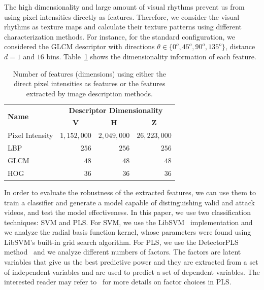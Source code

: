 \documentclass[journal]{IEEEtran}
\newcommand {\otoprule}{\midrule[\heavyrulewidth]}
\begin{document}
The high dimensionality and large amount of visual rhythms prevent us from using pixel intensities {directly} as features. Therefore, we consider the visual rhythms as texture maps and calculate their texture patterns using different characterization methods. For instance, for the standard configuration, we considered the GLCM descriptor with directions $\theta \in \{0^{o}, 45^{o}, 90^{o}, 135^{o}\}$, distance $d = 1$ and $16$ bins. {Table~\ref{table:dimensaoGLCM} shows the dimensionality {information} of each feature.}
%
\begin{table}[!htb]
\centering
{%
\caption{Number of features (dimensions) using either the direct pixel intensities as features or the features extracted by image description methods.}
\label{table:dimensaoGLCM}
\begin{tabular}{lrrr}
\toprule
\multirow{2}{*}{\textbf{Name}} & \multicolumn{3}{c}{\centering \textbf{Descriptor Dimensionality}}\\
\cmidrule(r){2-4}
& \multicolumn{1}{c}{\textbf{V}} & \multicolumn{1}{c}{\textbf{H}} & \multicolumn{1}{c}{\textbf{Z}}\\
\otoprule
Pixel Intensity & $1,152,000$ & $2,049,000$ & $26,223,000$ \\
\hline
LBP & $256$ & $256$ & $256$ \\
\hline
GLCM & $48$ & $48$ & $48$ \\
\hline
HOG & $36$ & $36$ & $36$ \\
\bottomrule
\end{tabular}
}
\end{table}
In order to evaluate the robustness of the extracted features, we can use them to train a classifier and generate a model capable of distinguishing valid and attack videos, and test the model effectiveness. In this paper, we use two classification techniques: SVM and PLS. For SVM, we use the LibSVM~\cite{Chang:2011:TIST} implementation and we analyze the radial basis function kernel, whose parameters were found using {LibSVM's built-in} grid search algorithm. For PLS, we use the DetectorPLS method~\cite{schwartz09c} and we analyze different numbers of factors. The factors are latent variables that give us the best predictive power and they are extracted from a set of independent variables and are used to predict a set of dependent variables. {The interested reader may refer to~\cite{schwartz09c} for more details on factor choices in PLS.}
\end{document}
